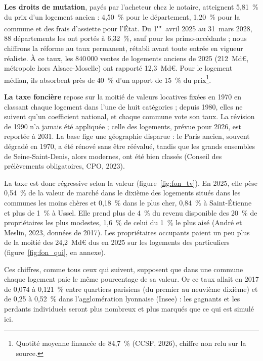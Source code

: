 
\textbf{Les droits de mutation}, payés par l'acheteur chez le notaire, atteignent 5,81~\% du prix d'un logement ancien :
4,50~\% pour le département, 1,20~\% pour la commune et des frais d'assiette pour l'État. Du 1\textsuperscript{er}~avril
2025 au 31~mars 2028, 88 départements les ont portés à 6,32~\%, sauf pour les primo-accédants ; nous chiffrons la
réforme au taux permanent, rétabli avant toute entrée en vigueur réaliste. À ce taux, les 840\,000 ventes de logements
anciens de 2025 (212~Md€, métropole hors Alsace-Moselle) ont rapporté 12,3~Md€. Pour le logement médian,
ils absorbent près de 40~\% d'un apport de 15~\% du prix\footnote{Quotité moyenne financée de 84,7~\% (CCSF, 2026),
chiffre non relu sur la source.}.

\textbf{La taxe foncière} repose sur la moitié de valeurs locatives fixées en 1970 en classant chaque logement dans
l'une de huit catégories ; depuis 1980, elles ne suivent qu'un coefficient national, et chaque commune vote son taux. La révision de 1990 n'a jamais été appliquée ; celle des logements, prévue pour 2026, est
reportée à 2031. La base fige une géographie disparue : le Paris ancien, souvent dégradé en 1970, a été rénové sans être
réévalué, tandis que les grands ensembles de Seine-Saint-Denis, alors modernes, ont été bien classés (Conseil des
prélèvements obligatoires, CPO, 2023).

La taxe est donc régressive selon la valeur (figure~\ref{fig:fon_tv}). En 2025, elle pèse 0,54~\% de la valeur de
marché dans le dixième des logements situés dans les communes les moins chères et 0,18~\% dans le plus cher, 0,84~\% à
Saint-Étienne et plus de 1~\% à Ussel.
Elle prend plus de 4~\% du revenu disponible des 20~\% de propriétaires les plus modestes, 1,6~\% de celui du 1~\% le
plus aisé (André et Meslin, 2023, données de 2017). Les
propriétaires occupants paient un peu plus de la moitié des 24,2~Md€ dus en 2025 sur les logements des particuliers
(figure~\ref{fig:fon_qui}, en annexe).


Ces chiffres, comme tous ceux qui suivent, supposent que dans une commune chaque logement paie le même pourcentage de sa
valeur. Or ce taux allait en 2017 de 0,074 à 0,121~\% entre quartiers parisiens (du premier au neuvième dixième) et de
0,25 à 0,52~\% dans l'agglomération lyonnaise (Insee) : les gagnants et les perdants individuels seront plus nombreux et
plus marqués que ce qui est simulé ici.

